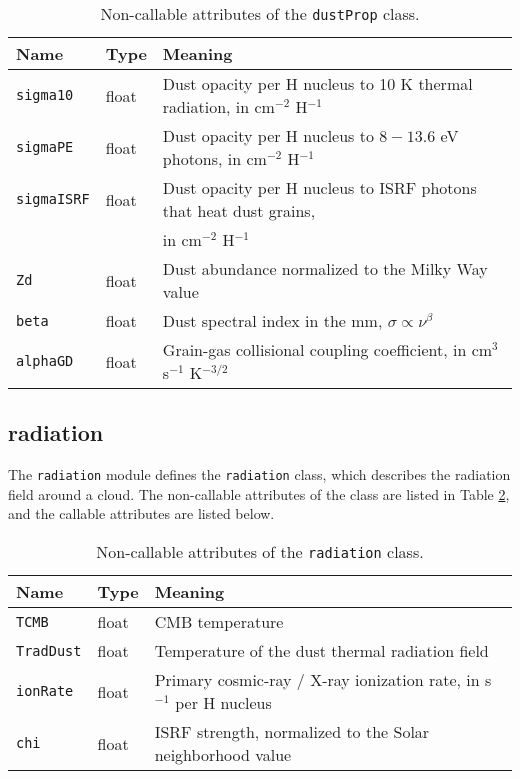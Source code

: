 \documentclass[12pt]{article}
\begin{document}
\begin{table}
\begin{center}
\begin{tabular}{lll}
\hline\hline
Name & Type & Meaning \\
\hline\hline
\texttt{sigma10} & float & Dust opacity per H nucleus to 10 K thermal radiation, in cm$^{-2}$ H$^{-1}$ \\
\texttt{sigmaPE} & float & Dust opacity per H nucleus to $8-13.6$ eV photons, in cm$^{-2}$ H$^{-1}$ \\
\texttt{sigmaISRF} & float & Dust opacity per H nucleus to ISRF photons that heat dust grains, \\
& & \quad in cm$^{-2}$ H$^{-1}$ \\
\texttt{Zd} & float & Dust abundance normalized to the Milky Way value \\
\texttt{beta} & float & Dust spectral index in the mm, $\sigma\propto \nu^\beta$ \\
\texttt{alphaGD} & float & Grain-gas collisional coupling coefficient, in cm$^3$ s$^{-1}$ K$^{-3/2}$ \\
\hline
\end{tabular}
\caption{
\label{tab:dust}
Non-callable attributes of the \texttt{dustProp} class.
}
\end{center}
\end{table}


\clearpage

\subsection{radiation}

The \verb=radiation= module defines the \verb=radiation= class, which describes the radiation field around a cloud. The non-callable attributes of the class are listed in Table \ref{tab:rad}, and the callable attributes are listed below.

\begin{table}
\begin{center}
\begin{tabular}{lll}
\hline\hline
Name & Type & Meaning \\
\hline\hline
\texttt{TCMB} & float & CMB temperature \\
\texttt{TradDust} & float & Temperature of the dust thermal radiation field \\
\texttt{ionRate} & float & Primary cosmic-ray / X-ray ionization rate, in s$^{-1}$ per H nucleus \\
\texttt{chi} & float & ISRF strength, normalized to the Solar neighborhood value \\
\hline
\end{tabular}
\caption{
\label{tab:rad}
Non-callable attributes of the \texttt{radiation} class.
}
\end{center}
\end{table}
\end{document}
